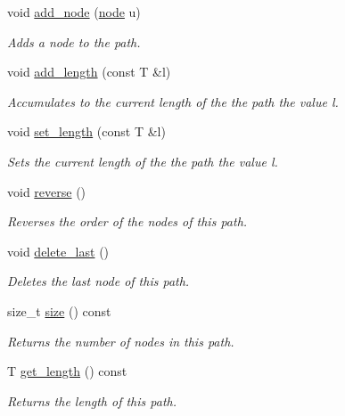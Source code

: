 \begin{DoxyCompactItemize}
void \hyperlink{classlgraph_1_1node__path_a273833cfc024fdfbd7ab69002a387f14}{add\+\_\+node} (\hyperlink{namespacelgraph_a397169dd66adf725210a30fb7251773e}{node} u)
\begin{DoxyCompactList}\small\item\em Adds a node to the path. \end{DoxyCompactList}\item 
void \hyperlink{classlgraph_1_1node__path_a65d2c02853fde5e1c004b74d2caf86e0}{add\+\_\+length} (const T \&l)
\begin{DoxyCompactList}\small\item\em Accumulates to the current length of the the path the value l. \end{DoxyCompactList}\item 
void \hyperlink{classlgraph_1_1node__path_a3fc92cd79059820c0206435d8546b90c}{set\+\_\+length} (const T \&l)
\begin{DoxyCompactList}\small\item\em Sets the current length of the the path the value l. \end{DoxyCompactList}\item 
\mbox{\label{classlgraph_1_1node__path_a0a0b6d96c810c0b0b39d4e54661e4dcf}} 
void \hyperlink{classlgraph_1_1node__path_a0a0b6d96c810c0b0b39d4e54661e4dcf}{reverse} ()
\begin{DoxyCompactList}\small\item\em Reverses the order of the nodes of this path. \end{DoxyCompactList}\item 
void \hyperlink{classlgraph_1_1node__path_a6b6f977475b90fda9ea44e6cfc05f40b}{delete\+\_\+last} ()
\begin{DoxyCompactList}\small\item\em Deletes the last node of this path. \end{DoxyCompactList}\item 
size\+\_\+t \hyperlink{classlgraph_1_1node__path_a3629afe5f34d1ea3b220aa266e0b1ada}{size} () const
\begin{DoxyCompactList}\small\item\em Returns the number of nodes in this path. \end{DoxyCompactList}\item 
T \hyperlink{classlgraph_1_1node__path_af87f77447320eadcd98e08a76d7e1f58}{get\+\_\+length} () const
\begin{DoxyCompactList}\small\item\em Returns the length of this path. \end{DoxyCompactList}\item 

\end{DoxyCompactItemize}
